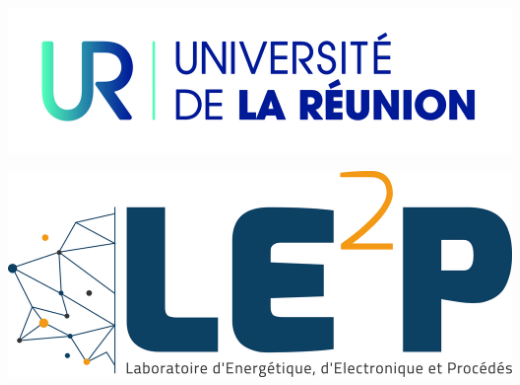\documentclass[11pt,oneside]{article}
\begin{document}
\begin{titlepage}
\phantom{aaaaaaaaaaaaaaaaaaaaaaaaaaaaaaaaaaaaaaa
ytrfdytfugvghikuhjbiujbhaaaaaaaaaaaaaaa}


\begin{minipage}[c]{.46\linewidth}
		\centering
		\includegraphics[scale=0.1]{logo} 
	\end{minipage}
\hfill%
\begin{minipage}[c]{.46\linewidth}
		\centering
		\includegraphics[scale=0.04]{LE2P} 
\end{minipage}




\end{titlepage}
\end{document}
